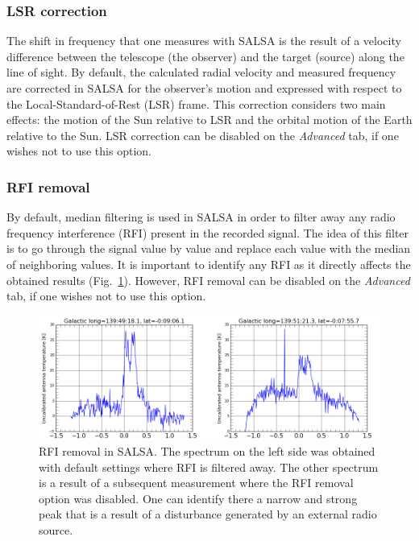 \subsubsection{LSR correction}
The shift in frequency that one measures with SALSA is the result of 
a velocity difference between the telescope (the observer) and the target (source) 
along the line of sight. By default, the calculated radial velocity and measured frequency 
are corrected in SALSA for the observer's motion and expressed with respect to the Local-Standard-of-Rest (LSR) 
frame. This correction considers two main effects: the motion of the Sun relative 
to LSR and the orbital motion of the Earth relative to the Sun. LSR correction can be disabled on the \emph{Advanced} tab,
if one wishes not to use this option.
\subsubsection{RFI removal}
By default, median filtering is used in SALSA in order to filter away any radio frequency interference (RFI) 
present in the recorded signal. The idea of this filter is to go through the signal value by value and 
replace each value with the median of neighboring values. It is important to identify any RFI as it directly 
affects the obtained results (Fig.~\ref{fig:RFIremoval}). However, RFI removal can be disabled on
the \emph{Advanced} tab, if one wishes not to use this option.
\begin{figure}[ht]
\begin{center}
\includegraphics[width=\textwidth]{../figures/RFIremoval.png}
\end{center}
\caption{RFI removal in SALSA. The spectrum on the left side was obtained with default settings where RFI is filtered away. 
The other spectrum is a result of a subsequent measurement where the RFI removal option was disabled. One can identify there a narrow 
and strong peak that is a result of a disturbance generated by an external radio source. }
\label{fig:RFIremoval}
\end{figure}
